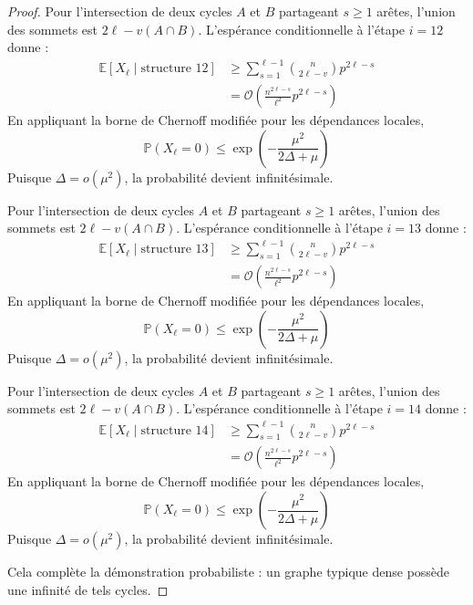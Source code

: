 \documentclass[11pt,a4paper]{article}
\theoremstyle{definition}
\begin{document}
\begin{proof}
Pour l'intersection de deux cycles $A$ et $B$ partageant $s \ge 1$ arêtes, l'union des sommets est $2\ell - v(A \cap B)$.
L'espérance conditionnelle à l'étape $i=12$ donne :
\begin{align*}
\mathbb{E}[X_\ell \mid \text{structure } 12] &\ge \sum_{s=1}^{\ell-1} \binom{n}{2\ell - v} p^{2\ell - s} \\
&= \mathcal{O}\left( \frac{n^{2\ell - s}}{\ell^2} p^{2\ell - s} \right)
\end{align*}
En appliquant la borne de Chernoff modifiée pour les dépendances locales,
\begin{equation}
\mathbb{P}(X_\ell = 0) \le \exp\left(-\frac{\mu^2}{2\Delta + \mu}\right)
\end{equation}
Puisque $\Delta = o(\mu^2)$, la probabilité devient infinitésimale.

Pour l'intersection de deux cycles $A$ et $B$ partageant $s \ge 1$ arêtes, l'union des sommets est $2\ell - v(A \cap B)$.
L'espérance conditionnelle à l'étape $i=13$ donne :
\begin{align*}
\mathbb{E}[X_\ell \mid \text{structure } 13] &\ge \sum_{s=1}^{\ell-1} \binom{n}{2\ell - v} p^{2\ell - s} \\
&= \mathcal{O}\left( \frac{n^{2\ell - s}}{\ell^2} p^{2\ell - s} \right)
\end{align*}
En appliquant la borne de Chernoff modifiée pour les dépendances locales,
\begin{equation}
\mathbb{P}(X_\ell = 0) \le \exp\left(-\frac{\mu^2}{2\Delta + \mu}\right)
\end{equation}
Puisque $\Delta = o(\mu^2)$, la probabilité devient infinitésimale.

Pour l'intersection de deux cycles $A$ et $B$ partageant $s \ge 1$ arêtes, l'union des sommets est $2\ell - v(A \cap B)$.
L'espérance conditionnelle à l'étape $i=14$ donne :
\begin{align*}
\mathbb{E}[X_\ell \mid \text{structure } 14] &\ge \sum_{s=1}^{\ell-1} \binom{n}{2\ell - v} p^{2\ell - s} \\
&= \mathcal{O}\left( \frac{n^{2\ell - s}}{\ell^2} p^{2\ell - s} \right)
\end{align*}
En appliquant la borne de Chernoff modifiée pour les dépendances locales,
\begin{equation}
\mathbb{P}(X_\ell = 0) \le \exp\left(-\frac{\mu^2}{2\Delta + \mu}\right)
\end{equation}
Puisque $\Delta = o(\mu^2)$, la probabilité devient infinitésimale.

Cela complète la démonstration probabiliste : un graphe typique dense possède une infinité de tels cycles.
\end{proof}
\end{document}
